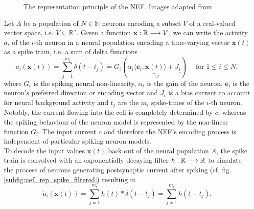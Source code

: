 \begin{figure}[t!]
{	}
	\caption{The representation principle of the \ac{NEF}. Images adapted from \cite{Bekolay2014}}\label{fig:nef_representation}
\end{figure}
Let $A$ be a population of $N \in \mathbb{N}$ neurons encoding a subset $V$ of a real-valued vector space, i.e. $V\subseteq \mathbb{R}^{n}$.
Given a function $\mathbf{x}: \mathbb{R} \longrightarrow V$, we can write the activity $a_{i}$ of the $i$-th neuron in a neural population encoding a time-varying vector $\mathbf{x}(t)$ as a spike train, i.e. a sum of delta functions
\begin{equation}
a_{i}\left(\mathbf{x}(t)\right) = \sum_{j=1}^{m_{i}} \delta(t - t_{j}) = G_{i}(\underbrace{\alpha_{i}\langle\mathbf{e}_{i},\mathbf{x}(t)\rangle + J_{i}}_{=:c}) \quad \textrm{ for } 1 \leq i \leq N, 
\label{eq:nef_encoding}
\end{equation}
where $G_{i}$ is the spiking neural non-linearity, $\alpha_{i}$ is the gain of the neuron, $\mathbf{e}_{i}$ is the neuron's preferred direction or encoding vector and $J_{i}$ is a bias current to account for neural background activity and $t_{j}$ are the $m_{i}$ spike-times of the $i$-th neuron.
Notably, the current flowing into the cell is completely determined by $c$, whereas the spiking behaviour of the neuron model is represented by the non-linear function $G_{i}$.
The input current $c$ and therefore the \ac{NEF}'s encoding process is independent of particular spiking neuron models.\\
To decode the input values $\mathbf{x}(t)$ back out of the neural population $A$, the spike train is convolved with an exponentially decaying filter $h: \mathbb{R} \longrightarrow \mathbb{R}$ to simulate the process of neurons generating postsynaptic current after spiking (cf. fig. \ref{subfig:nef_rep_spike_filtered}) resulting in
\begin{equation}
\tilde{a}_{i}\left(\mathbf{x}(t)\right) = \sum_{j=1}^{m_{i}} h(t) \ast \delta(t - t_{j}) = \sum_{j=1}^{m_{i}} h(t - t_{j}).
\label{eq:nef_filtered_activity}
\end{equation}
